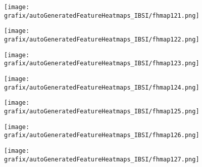 \hspace{\hsp} 
\begin{subfigure}{\wid\textwidth} 
    \centering 
    \caption{\tiny \sffamily {}} 
    \vspace{\vsp} 
    \texttt{[image: grafix/autoGeneratedFeatureHeatmaps\_IBSI/fhmap121.png]} 
\end{subfigure} 
\hspace{\hsp} 
\begin{subfigure}{\wid\textwidth} 
    \centering 
    \caption{\tiny \sffamily {}} 
    \vspace{\vsp} 
    \texttt{[image: grafix/autoGeneratedFeatureHeatmaps\_IBSI/fhmap122.png]} 
\end{subfigure} 
\hspace{\hsp} 
\begin{subfigure}{\wid\textwidth} 
    \centering 
    \caption{\tiny \sffamily {}} 
    \vspace{\vsp} 
    \texttt{[image: grafix/autoGeneratedFeatureHeatmaps\_IBSI/fhmap123.png]} 
\end{subfigure} 
\hspace{\hsp} 
\begin{subfigure}{\wid\textwidth} 
    \centering 
    \caption{\tiny \sffamily {}} 
    \vspace{\vsp} 
    \texttt{[image: grafix/autoGeneratedFeatureHeatmaps\_IBSI/fhmap124.png]} 
\end{subfigure} 
\hspace{\hsp} 
\begin{subfigure}{\wid\textwidth} 
    \centering 
    \caption{\tiny \sffamily {}} 
    \vspace{\vsp} 
    \texttt{[image: grafix/autoGeneratedFeatureHeatmaps\_IBSI/fhmap125.png]} 
\end{subfigure} 
\hspace{\hsp} 
\begin{subfigure}{\wid\textwidth} 
    \centering 
    \caption{\tiny \sffamily {}} 
    \vspace{\vsp} 
    \texttt{[image: grafix/autoGeneratedFeatureHeatmaps\_IBSI/fhmap126.png]} 
\end{subfigure} 
\hspace{\hsp} 
\begin{subfigure}{\wid\textwidth} 
    \centering 
    \caption{\tiny \sffamily {}} 
    \vspace{\vsp} 
    \texttt{[image: grafix/autoGeneratedFeatureHeatmaps\_IBSI/fhmap127.png]} 
\end{subfigure} 
